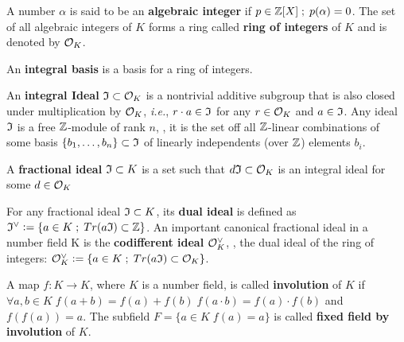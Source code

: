 \documentclass[a4paper,12pt]{article}
\begin{document}
\begin{definition}
A number $\alpha$ is said to be an \textbf{algebraic integer} if $ p \in \mathbb{Z}[X] \;;\; p(\alpha) = 0$. The set of all algebraic integers of $K$ forms a ring called \textbf{ring of integers} of $K$ and is denoted by $\mathcal{O}_K$.
\end{definition}

\begin{definition}
An \textbf{integral basis} is a basis for a ring of integers. 
\end{definition}

\begin{definition}
  An \textbf{integral Ideal} $\mathfrak{I} \subset \mathcal{O}_K$ is a  nontrivial additive subgroup that
  is also closed under multiplication by $\mathcal{O}_K$, \textit{i.e.}, $r \cdot a \in \mathfrak{I}$ for
  any $r \in \mathcal{O}_K$ and $a \in \mathfrak{I}$. Any ideal $\mathfrak{I}$ is a free $\mathbb{Z}$-module of rank
  $n$, \ie, it is the set off all $\mathbb{Z}$-linear combinations of some basis
  $\{b_1,\dots,b_n\} \subset \mathfrak{I}$  of linearly independents (over $\mathbb{Z}$) elements $b_i$.
\end{definition}

\begin{definition}
  A \textbf{fractional ideal} $\mathfrak{I} \subset K$ is a set such that $d\mathfrak{I} \subset \mathcal{O}_K$ is an
  integral ideal for some $d \in \mathcal{O}_K$
\end{definition}

\begin{definition}
  For any fractional ideal $\mathfrak{I} \subset K$, its \textbf{dual ideal} is defined as
  $\mathfrak{I}^\vee \vcentcolon = \{ a \in K \;;\; Tr(a\mathfrak{I}) \subset \mathbb{Z} \}$. An important canonical
  fractional ideal in a number field K is the \textbf{codifferent ideal}
  $\mathcal{O}_K^\vee$, \ie, the dual ideal of the ring of integers: $\mathcal{O}_K^\vee \vcentcolon = \{ a \in K \;;\; Tr(a\mathfrak{I}) \subset \mathcal{O}_K \}$.
\end{definition}

    \begin{definition}
\label{definition:fixed-field-by-involution}
      A map $f: K \rightarrow K$, where $K$ is a number field, is called \textbf{involution}
      of $K$ if $\forall a,b \in K \; f(a+b) = f(a) + f(b) \; f(a \cdot b) = f(a) \cdot f(b)$ and
      $f(f(a)) = a$. The subfield $F = \{a \in K \; f(a) = a\}$ is called \textbf{fixed field by
        involution} of $K$.
    \end{definition}
\end{document}
